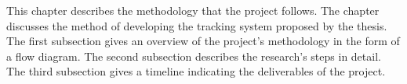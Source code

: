 This chapter describes the methodology that the project follows.
The chapter discusses the method of developing the tracking system proposed by the thesis.
The first subsection gives an overview of the project's methodology in the form of a flow diagram.
The second subsection describes the research's steps in detail.
The third subsection gives a timeline indicating the deliverables of the project.
